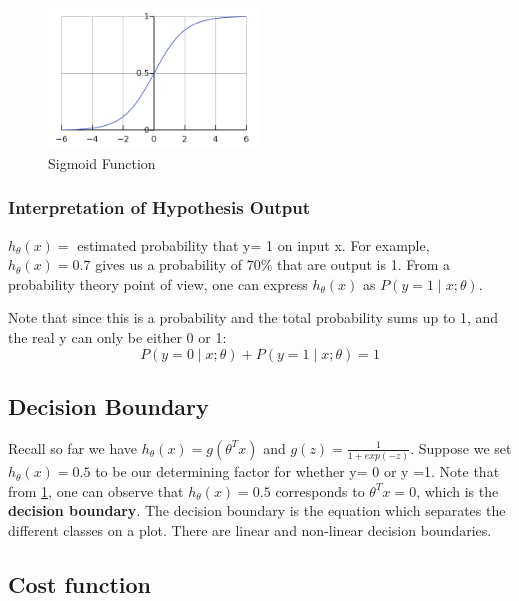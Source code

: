                 \begin{figure}[htbp]
                    \centering
                    \includegraphics[width=0.5\textwidth]{image/sigmoid-function.png}
                    \caption{Sigmoid Function}
                    \label{fig:sigmoid-function}
                \end{figure}


        \subsubsection{Interpretation of Hypothesis Output}
        $ h_\theta (x)= $ estimated probability that y= 1 on input x. For example, $h_\theta(x)= 0.7$ gives us a probability of 70\% that are output is 1. 
        From a probability theory point of view, one can express $h_\theta (x)$ as $ P(y=1 \mid x;\theta)$. 

        Note that since this is a probability and the total probability sums up to 1, and the real y can only be either 0 or 1:
        \[
            P(y=0 \mid x; \theta) + P(y=1 \mid x;\theta) = 1
        \] 
            


    \subsection{Decision Boundary}

    Recall so far we have $h_\theta (x) = g(\theta^T x)$ and $g(z) = \frac{1}{1+exp(-z)}$. Suppose we set $h_\theta(x) = 0.5$ to be our determining factor for whether y= 0 or y =1. Note that from \ref{fig:sigmoid-function}, one can observe that $h_\theta(x) = 0.5$ corresponds to $\theta^T x = 0$, which is the \textbf{decision boundary}. The decision boundary is the equation which separates the different classes on a plot. There are linear and non-linear decision boundaries.


    \subsection{Cost function}

